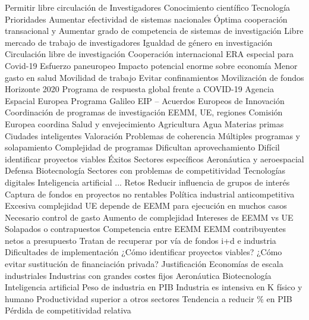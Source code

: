 \documentclass{nuevotema}
\begin{document}
\begin{esquemal}
				\4 Permitir libre circulación de
				\4[] Investigadores
				\4[] Conocimiento científico
				\4[] Tecnología
				\4 Prioridades
				\4[] Aumentar efectividad de sistemas nacionales
				\4[] Óptima cooperación transacional y
				\4[] Aumentar grado de competencia de sistemas de investigación
				\4[] Libre mercado de trabajo de investigadores
				\4[] Igualdad de género en investigación
				\4[] Circulación libre de investigación
				\4[] Cooperación internacional
			\3 ERA especial para Covid-19
				\4 Esfuerzo paneuropeo
				\4 Impacto potencial enorme sobre economía
				\4[] Menor gasto en salud
				\4[] Movilidad de trabajo
				\4[] Evitar confinamientos
				\4 Movilización de fondos Horizonte 2020
			\3 Programa de respuesta global frente a COVID-19
			\3 Agencia Espacial Europea
			\3 Programa Galileo
			\3 EIP -- Acuerdos Europeos de Innovación
				\4 Coordinación de programas de investigación
				\4[] EEMM, UE, regiones
				\4[] Comisión Europea coordina
				\4 Salud y envejecimiento
				\4 Agricultura
				\4 Agua
				\4 Materias primas
				\4 Ciudades inteligentes
		\2 Valoración
			\3 Problemas de coherencia
				\4 Múltiples programas y solapamiento
			\3 Complejidad de programas
				\4 Dificultan aprovechamiento
				\4 Difícil identificar proyectos viables
			\3 Éxitos
				\4 Sectores específicos
				\4[] Aeronáutica y aeroespacial
				\4[] Defensa
				\4[] Biotecnología
				\4 Sectores con problemas de competitividad
				\4[] Tecnologías digitales
				\4[] Inteligencia artificial
				\4[] ...
		\2 Retos
			\3 Reducir influencia de grupos de interés
				\4 Captura de fondos en proyectos no rentables
				\4 Política industrial anticompetitiva
			\3 Excesiva complejidad
				\4 UE depende de EEMM para ejecución en muchos casos
				\4 Necesario control de gasto
				\4[$\then$] Aumento de complejidad
			\3 Intereses de EEMM vs UE
				\4 Solapados o contrapuestos
				\4 Competencia entre EEMM
				\4 EEMM contribuyentes netos a presupuesto
				\4[] Tratan de recuperar por vía de fondos i+d e industria
			\3 Dificultades de implementación
				\4 ¿Cómo identificar proyectos viables?
				\4 ¿Cómo evitar sustitución de financiación privada?
	\1 
		\2 Justificación
			\3 Economías de escala industriales
				\4 Industrias con grandes costes fijos
				\4[] Aeronáutica
				\4[] Biotecnología
				\4[] Inteligencia artificial
			\3 Peso de industria en PIB
				\4 Industria es intensiva en K físico y humano
				\4 Productividad superior a otros sectores
				\4 Tendencia a reducir \% en PIB
			\3 Pérdida de competitividad relativa

\end{esquemal}
\end{document}
